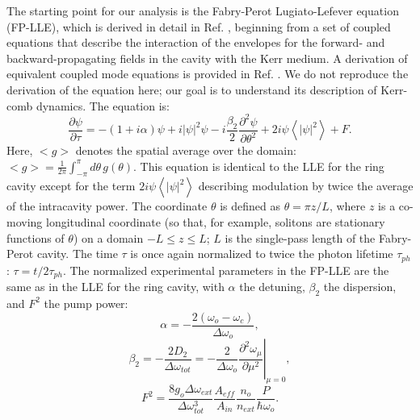 The starting point for our analysis is the Fabry-Perot Lugiato-Lefever equation (FP-LLE), which is derived in detail in Ref. , beginning from a set of coupled equations that describe the interaction of the envelopes for the forward- and backward-propagating fields in the cavity with the Kerr medium. A derivation of equivalent coupled mode equations is provided in Ref. . We do not reproduce the derivation of the equation here; our goal is to understand its description of Kerr-comb dynamics. The equation is:
\begin{equation}
\frac{\partial\psi}{\partial\tau}=-(1+i\alpha)\psi+i|\psi|^2\psi-i\frac{\beta_2}{2}\frac{\partial^2\psi}{\partial\theta^2}+2i\psi\left<|\psi|^2\right>+F\label{eq:FPLLE}.
\end{equation}
Here, $<g>$ denotes the spatial average over the domain: $<g>=\frac{1}{2\pi}\int_{-\pi}^{\pi}d\theta\,g(\theta)$. This equation is identical to the LLE for the ring cavity except for the term $2i\psi\left<|\psi|^2\right>$ describing modulation by twice the average of the intracavity power. The coordinate $\theta$ is defined as $\theta=\pi z/L$, where $z$ is a co-moving longitudinal coordinate (so that, for example, solitons are stationary functions of $\theta$) on a domain $-L\leq z\leq L$; $L$ is the single-pass length of the Fabry-Perot cavity. The time $\tau$ is once again normalized to twice the photon lifetime $\tau_{ph}$: $\tau=t/2\tau_{ph}$. The normalized experimental parameters in the FP-LLE are the same as in the LLE for the ring cavity, with $\alpha$ the detuning, $\beta_2$ the dispersion, and $F^2$ the pump power:
\begin{equation}
\alpha=-\frac{2(\omega_o-\omega_c)}{\Delta\omega_o},
\end{equation}
\begin{equation}
\beta_2=\left.-\frac{2D_2}{\Delta\omega_{tot}}=-\frac{2}{\Delta\omega_o}\frac{\partial^2\omega_\mu}{\partial \mu^2}\right|_{\mu=0}, \label{betaLLE}
\end{equation}
\begin{equation}
F^2=\frac{8g_o\Delta\omega_{ext}}{\Delta\omega_{tot}^3}\frac{A_{eff}}{A_{in}}\frac{n_o}{n_{ext}}\frac{P}{\hbar\omega_o}.
\end{equation}
